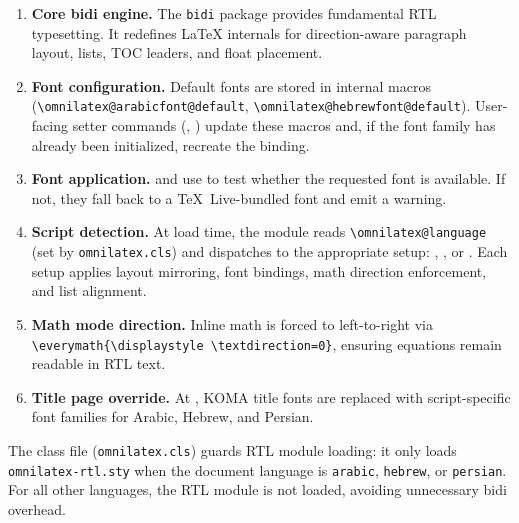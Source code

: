 \begin{enumerate}
  \item \textbf{Core bidi engine.}  The \texttt{bidi} package provides
    fundamental RTL typesetting.  It redefines LaTeX internals for
    direction-aware paragraph layout, lists, TOC leaders, and float
    placement.

  \item \textbf{Font configuration.}  Default fonts are stored in
    internal macros (\texttt{\textbackslash omnilatex@arabicfont@default},
    \texttt{\textbackslash omnilatex@hebrewfont@default}).  User-facing
    setter commands (, ) update these
    macros and, if the font family has already been initialized, recreate
    the  binding.

  \item \textbf{Font application.}   and
     use  to test
    whether the requested font is available.  If not, they fall back to
    a TeX~Live-bundled font and emit a warning.

  \item \textbf{Script detection.}  At load time, the module reads
    \texttt{\textbackslash omnilatex@language} (set by
    \texttt{omnilatex.cls}) and dispatches to the appropriate setup:
    , , or
    .  Each setup applies layout mirroring,
    font bindings, math direction enforcement, and list alignment.

  \item \textbf{Math mode direction.}  Inline math is forced to
    left-to-right via
    \texttt{\textbackslash everymath\{\textbackslash displaystyle%
    \textbackslash textdirection=0\}}, ensuring equations remain
    readable in RTL text.

  \item \textbf{Title page override.}  At , KOMA
    title fonts are replaced with script-specific font families for
    Arabic, Hebrew, and Persian.
\end{enumerate}

The class file (\texttt{omnilatex.cls}) guards RTL module loading: it
only loads \texttt{omnilatex-rtl.sty} when the document language is
\texttt{arabic}, \texttt{hebrew}, or \texttt{persian}.  For all other
languages, the RTL module is not loaded, avoiding unnecessary bidi
overhead.
